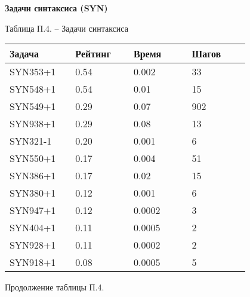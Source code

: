 \textbf{Задачи синтаксиса (SYN)}

\begin{center}
Таблица П.4. -- Задачи синтаксиса
\end{center}

\begin{longtable}[H]{|p{0.2\linewidth}|p{0.2\linewidth}|p{0.2\linewidth}|p{0.2\linewidth}|}
\hline
\textbf{Задача} & \textbf{Рейтинг} & \textbf{Время} & \textbf{Шагов} \\
\hline
SYN353+1 &  0.54 &  0.002 &  33 \\
\hline
SYN548+1 &  0.54 &  0.01 &  15 \\
\hline
SYN549+1 &  0.29 &  0.07 &  902 \\
\hline
SYN938+1 &  0.29 &  0.08 &  13 \\
\hline
SYN321-1 &  0.20 &  0.001 &  6 \\
\hline
SYN550+1 &  0.17 &  0.004 &  51 \\
\hline
SYN386+1 &  0.17 &  0.02 &  15 \\
\hline
SYN380+1 &  0.12 &  0.001 &  6 \\
\hline
SYN947+1 &  0.12 &  0.0002 &  3 \\
\hline
SYN404+1 &  0.11 &  0.0005 &  2 \\
\hline
SYN928+1 &  0.11 &  0.0002 &  2 \\
\hline
SYN918+1 &  0.08 &  0.0005 &  5 \\
\hline
\end{longtable}
\begin{center}
Продолжение таблицы П.4.
\end{center}

